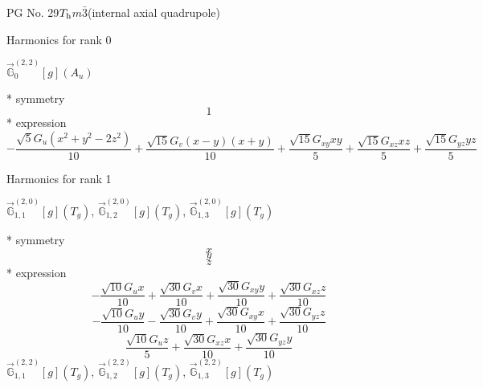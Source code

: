 \documentclass[fleqn,8pt]{jsarticle}
\begin{document}
\setcounter{MaxMatrixCols}{32}

\renewcommand{\tablename}{Table~}
\renewcommand{\figurename}{Figure~}
\begin{center}
\LARGE
PG No. 29\quad$T_{\rm h}$\quad$m\bar{3}$\quad[ cubic ] (internal axial quadrupole)
\end{center}

\noindent * Harmonics for rank 0

\noindent\quad $\vec{\mathbb{G}}_{0}^{(2,2)}[g](A_{u})$

\noindent\quad ** symmetry
\begin{dmath*}
1
\end{dmath*}
\noindent\quad ** expression
\begin{dmath*}
- \frac{\sqrt{5} G_{u} \left(x^{2} + y^{2} - 2 z^{2}\right)}{10} + \frac{\sqrt{15} G_{v} \left(x - y\right) \left(x + y\right)}{10} + \frac{\sqrt{15} G_{xy} x y}{5} + \frac{\sqrt{15} G_{xz} x z}{5} + \frac{\sqrt{15} G_{yz} y z}{5}
\end{dmath*}

\noindent * Harmonics for rank 1

\noindent\quad $\vec{\mathbb{G}}_{1,1}^{(2,0)}[g](T_{g})$, $\vec{\mathbb{G}}_{1,2}^{(2,0)}[g](T_{g})$, $\vec{\mathbb{G}}_{1,3}^{(2,0)}[g](T_{g})$

\noindent\quad ** symmetry
\begin{dmath*}
x
\end{dmath*}
\begin{dmath*}
y
\end{dmath*}
\begin{dmath*}
z
\end{dmath*}
\noindent\quad ** expression
\begin{dmath*}
- \frac{\sqrt{10} G_{u} x}{10} + \frac{\sqrt{30} G_{v} x}{10} + \frac{\sqrt{30} G_{xy} y}{10} + \frac{\sqrt{30} G_{xz} z}{10}
\end{dmath*}
\begin{dmath*}
- \frac{\sqrt{10} G_{u} y}{10} - \frac{\sqrt{30} G_{v} y}{10} + \frac{\sqrt{30} G_{xy} x}{10} + \frac{\sqrt{30} G_{yz} z}{10}
\end{dmath*}
\begin{dmath*}
\frac{\sqrt{10} G_{u} z}{5} + \frac{\sqrt{30} G_{xz} x}{10} + \frac{\sqrt{30} G_{yz} y}{10}
\end{dmath*}
\noindent\quad $\vec{\mathbb{G}}_{1,1}^{(2,2)}[g](T_{g})$, $\vec{\mathbb{G}}_{1,2}^{(2,2)}[g](T_{g})$, $\vec{\mathbb{G}}_{1,3}^{(2,2)}[g](T_{g})$
\end{document}
